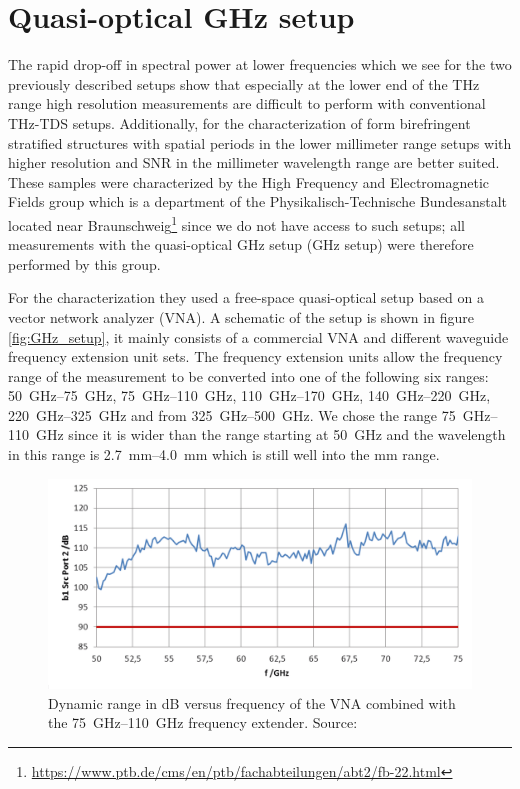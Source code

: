 \section{Quasi-optical GHz setup}
\label{sec:GHz_setup}
The rapid drop-off in spectral power at lower frequencies which we see for the two previously described setups show that especially at the lower end of the THz range high resolution measurements are difficult to perform with conventional THz-TDS setups. Additionally, for the characterization of form birefringent stratified structures with spatial periods in the lower millimeter range setups with higher resolution and SNR in the millimeter wavelength range are better suited. These samples were characterized by the High Frequency and Electromagnetic Fields group which is a department of the Physikalisch-Technische Bundesanstalt located near Braunschweig\footnote{\url{https://www.ptb.de/cms/en/ptb/fachabteilungen/abt2/fb-22.html}} since we do not have access to such setups; all measurements with the quasi-optical GHz setup (GHz setup) were therefore performed by this group.

For the characterization they used a free-space quasi-optical setup based on a vector network analyzer (VNA). A schematic of the setup is shown in figure \ref{fig:GHz_setup}, it mainly consists of a commercial VNA and different waveguide frequency extension unit sets. The frequency extension units allow the frequency range of the measurement to be converted into one of the following six ranges: \SIrange[range-phrase=--]{50}{75}{\giga \hertz}, \SIrange[range-phrase=--]{75}{110}{\giga \hertz}, \SIrange[range-phrase=--]{110}{170}{\giga \hertz}, \SIrange[range-phrase=--]{140}{220}{\giga \hertz}, \SIrange[range-phrase=--]{220}{325}{\giga \hertz} and from \SIrange{325}{500}{\giga \hertz}. We chose the range \SIrange{75}{110}{\giga \hertz} since it is wider than the range starting at \SI{50}{\giga \hertz} and the wavelength in this range is \SIrange{2.7}{4.0}{\milli \meter} which is still well into the \si{\milli \meter} range. 

\begin{figure}[H]
    \centering
    \includegraphics[scale=0.4]{images/setup/DNR.png}
    \caption{Dynamic range in dB versus frequency of the VNA combined with the \SIrange[range-phrase=--]{75}{110}{\giga \hertz} frequency extender. Source: \cite{VNADNR2013}}
    \label{fig:VNA_DNR}
\end{figure}

